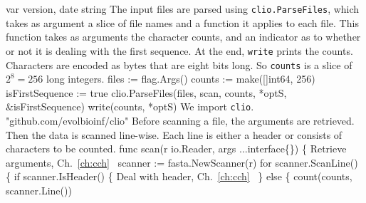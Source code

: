 var version, date string
\nwendcode{}\nwdocspar
The input files are parsed using \texttt{clio.ParseFiles}, which takes
as argument a slice of file names and a function it applies to each
file. This function takes as arguments the character counts, and an
indicator as to whether or not it is dealing with the first
sequence. At the end, \texttt{write} prints the counts.  Characters
are encoded as bytes that are eight bits long. So \texttt{counts} is a
slice of $2^8=256$ long integers.
\nwenddocs{}\endmoddef\nwstartdeflinemarkup{}\nwenddeflinemarkup
files := flag.Args()
counts := make([]int64, 256)
isFirstSequence := true
clio.ParseFiles(files, scan, counts, *optS, &isFirstSequence)
write(counts, *optS)
\nwendcode{}\nwdocspar
We import \texttt{clio}.
\nwenddocs{}\plusendmoddef\nwstartdeflinemarkup{}\nwenddeflinemarkup
"github.com/evolbioinf/clio"
\nwendcode{}\nwdocspar
Before scanning a file, the arguments are retrieved. Then the data is
scanned line-wise. Each line is either a header or consists of
characters to be counted.
\nwenddocs{}\endmoddef\nwstartdeflinemarkup{}\nwenddeflinemarkup
func scan(r io.Reader, args ...interface\{\}) \{
          \LA{}Retrieve arguments, Ch.~\ref{ch:cch}~{\nwtagstyle{}}\RA{}
          scanner := fasta.NewScanner(r)
          for scanner.ScanLine() \{
                  if scanner.IsHeader() \{
                          \LA{}Deal with header, Ch.~\ref{ch:cch}~{\nwtagstyle{}}\RA{}
                  \} else \{
                          count(counts, scanner.Line())
